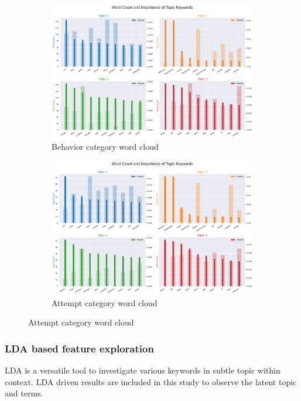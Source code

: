 \documentclass[sn-mathphys,Numbered]{sn-jnl}%
\theoremstyle{thmstyleone}%
\theoremstyle{thmstyletwo}%
\theoremstyle{thmstylethree}%
\begin{document}
\begin{figure}[h!]
\begin{subfigure}{0.45\textwidth}
    \includegraphics[width=\textwidth]{behavior_weight_relative_imp.png}
    \caption{Behavior category word cloud}
    \label{redditdist}
\end{subfigure}
\hfill
\begin{subfigure}{0.45\textwidth}
    \includegraphics[width=\textwidth]{attempt_weight_relative_imp.png}
    \caption{Attempt category word cloud}
    \label{twitterdist}
\end{subfigure}   
\label{redditdist_twitterdist}
\end{figure}


\subsubsection{LDA based feature exploration}
LDA is a versatile tool to investigate various keywords in subtle topic within context. LDA driven results are included in this study to observe the latent topic and terms. 
\end{document}
